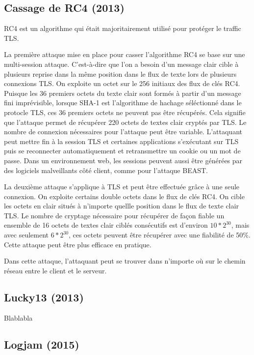 \subsection{Cassage de RC4 (2013)}
RC4 est un algorithme qui était majoritairement utilisé pour protéger le traffic TLS.

La première attaque mise en place pour casser l'algorithme RC4 se base sur une multi-session attaque. C'est-à-dire que l'on a besoin d'un message clair cible à plusieurs reprise dans la même position dans le flux de texte lors de plusieurs connexions TLS. On exploite un octet sur le 256 initiaux des flux de clés RC4. Puisque les 36 premiers octets du texte clair sont formés à partir d'un message fini imprévisible, lorsque SHA-1 est l'algorithme de hachage séléctionné dans le protocle TLS, ces 36 premiers octets ne peuvent pas être récupérés. Cela signifie que l'attaque permet de récupérer 220 octets de textes clair cryptés par TLS. Le nombre de connexion nécessaires pour l'attaque peut être variable. L'attaquant peut mettre fin à la session TLS et certaines applications s'exécutant sur TLS puis se reconnecter automatiquement et retransmettre un cookie ou un mot de passe. Dans un environnement web, les sessions peuvent aussi être générées par des logiciels malveillants côté client, comme pour l'attaque BEAST.

La deuxième attaque s'applique à TLS et peut être effectuée grâce à une seule connexion. On exploite certains double octets dans le flux de clés RC4. On cible les octets en clair situés à n'importe quellle position dans le flux de texte clair TLS. Le nombre de cryptage nécessaire pour récupérer de façon fiable un ensemble de 16 octets de textes clair ciblés consécutifs est d'environ $10*2^{30}$, mais avec seulement $6*2^{30}$, ces octets peuvent être récupérer avec une fiabilité de 50\%. Cette attaque peut être plus efficace en pratique.

Dans cette attaque, l'attaquant peut se trouver dans n'importe où sur le chemin réseau entre le client et le serveur\cite{rc4}.

\subsection{Lucky13 (2013)}

Blablabla \cite{lucky13}

\subsection{Logjam (2015)}

